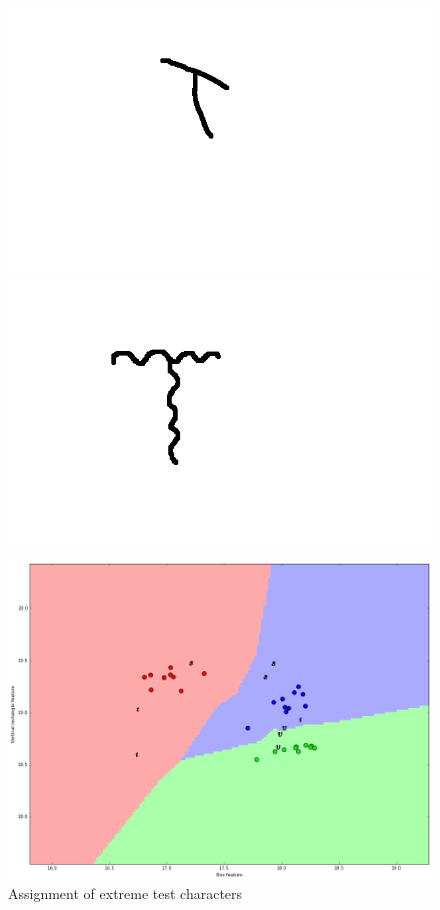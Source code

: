 \documentclass[a4paper,12px,twocolumn]{article}
\begin{document}
\begin{flushleft}
\begin{figure}[h!]
        \includegraphics[scale=0.1]{tT13}
        \includegraphics[scale=0.1]{tT12}
    \end{figure}

        \begin{figure}[h!]
          \caption{Assignment of extreme test characters}
          \includegraphics[scale=0.25]{extremechars}
        \end{figure}


\end{flushleft}
\end{document}
